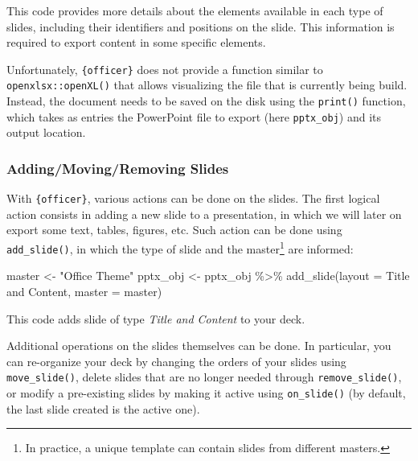 \documentclass[
]{krantz}
\makeatletter
\newenvironment{Shaded}{\begin{snugshade}}{\end{snugshade}}
\newcommand{\AttributeTok}[1]{\textcolor[rgb]{0.61,0.61,0.61}{#1}}
\newcommand{\FunctionTok}[1]{\textcolor[rgb]{0,0,0}{#1}}
\newcommand{\NormalTok}[1]{#1}
\newcommand{\OtherTok}[1]{\textcolor[rgb]{0.37,0.37,0.37}{#1}}
\newcommand{\SpecialCharTok}[1]{\textcolor[rgb]{0,0,0}{#1}}
\newcommand{\StringTok}[1]{\textcolor[rgb]{0.5,0.5,0.5}{#1}}
\renewenvironment{quote}{\begin{VF}}{\end{VF}}
\newenvironment{kframe}{%
\medskip{}
\setlength{\fboxsep}{.8em}
 \def\at@end@of@kframe{}%
 \ifinner\ifhmode%
  \def\at@end@of@kframe{\end{minipage}}%
  \begin{minipage}{\columnwidth}%
 \fi\fi%
 \def\FrameCommand##1{\hskip\@totalleftmargin \hskip-\fboxsep
 \colorbox{shadecolor}{##1}\hskip-\fboxsep
     \hskip-\linewidth \hskip-\@totalleftmargin \hskip\columnwidth}%
 \MakeFramed {\advance\hsize-\width
   \@totalleftmargin\z@ \linewidth\hsize
   \@setminipage}}%
 {\par\unskip\endMakeFramed%
 \at@end@of@kframe}
\renewenvironment{Shaded}{\begin{kframe}}{\end{kframe}}
\makeatother
\begin{document}
This code provides more details about the elements available in each type of slides, including their identifiers and positions on the slide. This information is required to export content in some specific elements.

\begin{quote}
Unfortunately, \texttt{\{officer\}} does not provide a function similar to \texttt{openxlsx::openXL()} that allows visualizing the file that is currently being build. Instead, the document needs to be saved on the disk using the \texttt{print()} function, which takes as entries the PowerPoint file to export (here \texttt{pptx\_obj}) and its output location.
\end{quote}

\hypertarget{addingmovingremoving-slides}{%
\subsubsection*{Adding/Moving/Removing Slides}\label{addingmovingremoving-slides}}


With \texttt{\{officer\}}, various actions can be done on the slides. The first logical action consists in adding a new slide to a presentation, in which we will later on export some text, tables, figures, etc. Such action can be done using \texttt{add\_slide()}, in which the type of slide and the master\footnote{In practice, a unique template can contain slides from different masters.} are informed:

\begin{Shaded}
\begin{Highlighting}[]
\NormalTok{master }\OtherTok{\textless{}{-}} \StringTok{"Office Theme"}
\NormalTok{pptx\_obj }\OtherTok{\textless{}{-}}\NormalTok{ pptx\_obj }\SpecialCharTok{\%\textgreater{}\%} 
  \FunctionTok{add\_slide}\NormalTok{(}\AttributeTok{layout =} \StringTok{\textquotesingle{}Title and Content\textquotesingle{}}\NormalTok{, }\AttributeTok{master =}\NormalTok{ master)}
\end{Highlighting}
\end{Shaded}

This code adds slide of type \emph{Title and Content} to your deck.

Additional operations on the slides themselves can be done. In particular, you can re-organize your deck by changing the orders of your slides using \texttt{move\_slide()}, delete slides that are no longer needed through \texttt{remove\_slide()}, or modify a pre-existing slides by making it active using \texttt{on\_slide()} (by default, the last slide created is the active one).
\end{document}
